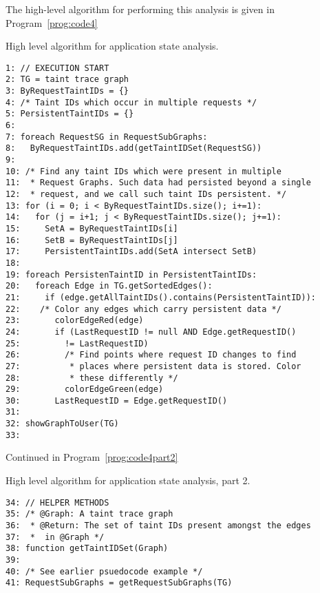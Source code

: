 \documentclass[msc,oneside]{ubcthesis}
\begin{document}
The high-level algorithm for performing this analysis is given in Program~\ref{prog:code4}

\begin{Program}
  \caption{\label{prog:code4} High level algorithm for application state analysis.}
\begin{verbatim}
1: // EXECUTION START
2: TG = taint trace graph
3: ByRequestTaintIDs = {}
4: /* Taint IDs which occur in multiple requests */
5: PersistentTaintIDs = {}
6: 
7: foreach RequestSG in RequestSubGraphs:
8:   ByRequestTaintIDs.add(getTaintIDSet(RequestSG))
9:   
10: /* Find any taint IDs which were present in multiple 
11:  * Request Graphs. Such data had persisted beyond a single
12:  * request, and we call such taint IDs persistent. */
13: for (i = 0; i < ByRequestTaintIDs.size(); i+=1):
14:   for (j = i+1; j < ByRequestTaintIDs.size(); j+=1):
15:     SetA = ByRequestTaintIDs[i]
16:     SetB = ByRequestTaintIDs[j]
17:     PersistentTaintIDs.add(SetA intersect SetB)
18: 
19: foreach PersistenTaintID in PersistentTaintIDs:
20:   foreach Edge in TG.getSortedEdges():
21:     if (edge.getAllTaintIDs().contains(PersistentTaintID)):
22:    /* Color any edges which carry persistent data */
23:       colorEdgeRed(edge)
24:       if (LastRequestID != null AND Edge.getRequestID() 
25:         != LastRequestID)
26:         /* Find points where request ID changes to find
27:          * places where persistent data is stored. Color
28:          * these differently */
29:         colorEdgeGreen(edge)
30:       LastRequestID = Edge.getRequestID()
31:       
32: showGraphToUser(TG)
33: 
\end{verbatim}
Continued in Program~\ref{prog:code4part2}
\end{Program}
\begin{Program}
  \caption{\label{prog:code4part2} High level algorithm for application state analysis, part 2.}
\begin{verbatim}
34: // HELPER METHODS
35: /* @Graph: A taint trace graph
36:  * @Return: The set of taint IDs present amongst the edges
37:  *  in @Graph */
38: function getTaintIDSet(Graph)
39: 
40: /* See earlier psuedocode example */
41: RequestSubGraphs = getRequestSubGraphs(TG)
\end{verbatim}
\end{Program}
\end{document}
